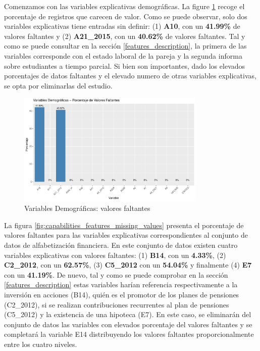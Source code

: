 \documentclass[a4paper, 11pt]{article}
\begin{document}
Comenzamos con las variables explicativas demográficas. La figure \ref{fig:demographic_features_missing_values}
recoge el porcentaje de registros que carecen de valor. Como se puede observar, solo dos 
variables explicativas tiene entradas sin definir: (1) \textbf{A10}, con un
\textbf{41.99\%} de valores faltantes y (2) \textbf{A21\_2015}, con un \textbf{40.62\%} de 
valores faltantes. Tal y como se puede consultar en la sección \ref{features_description}, la 
primera de las variables corresponde con el estado laboral de la pareja y la segunda informa 
sobre estudiantes a tiempo parcial. Si bien son importantes, dado los elevados porcentajes de
datos faltantes y el elevado numero de otras variables explicativas, se opta por eliminarlas
del estudio.

\begin{figure}[ht]
    \centering
    \includegraphics[width=0.8\textwidth]{images/Demographic_Features__Missing_Values.pdf} 
    \caption{Variables Demográficas: valores faltantes}
    \label{fig:demographic_features_missing_values}
\end{figure}

La figura \ref{fig:capabilities_features_missing_values} presenta el porcentaje de valores 
faltantes para las variables explicativas correspondientes al conjunto de datos de alfabetización
financiera. En este conjunto de datos existen cuatro variables explicativas con valores faltantes:
(1) \textbf{B14}, con un \textbf{4.33\%}, (2) \textbf{C2\_2012}, con un \textbf{62.57\%}, (3) 
\textbf{C5\_2012} con un \textbf{54.04\%} y finalmente (4) \textbf{E7} con un \textbf{41.19\%}. De
nuevo, tal y como se puede comprobar en la sección \ref{features_description} estas variables harían
referencia respectivamente a la inversión en acciones (B14), quién es el promotor de los planes de
pensiones (C2\_2012), si se realizan contribuciones recurrentes al plan de pensiones (C5\_2012) y
la existencia de una hipoteca (E7). En este caso, se eliminarán del conjunto de datos las
variables con elevados porcentaje del valores faltantes y se completará la variable E14 distribuyendo
los valores faltantes proporcionalmente entre los cuatro niveles.
\end{document}

